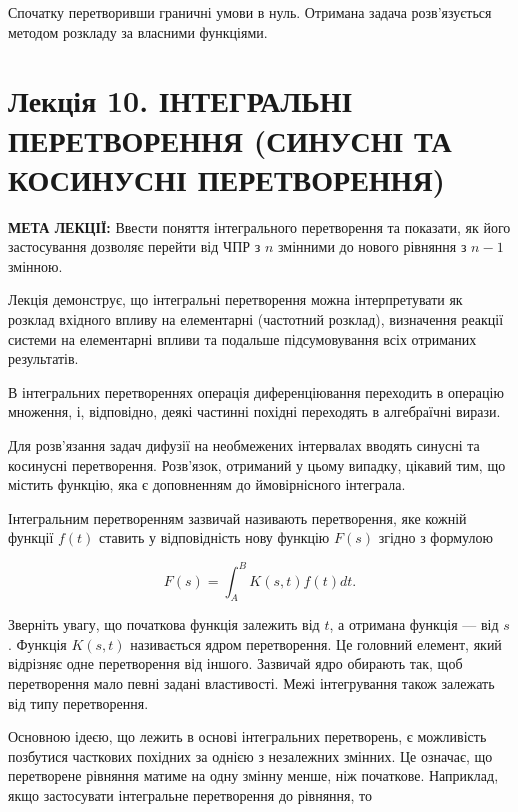\documentclass[
  ukrainian,
]{article}
\begin{document}
Спочатку перетворивши граничні умови в нуль. Отримана задача
розв'язується методом розкладу за власними функціями.

\section{Лекція 10. ІНТЕГРАЛЬНІ ПЕРЕТВОРЕННЯ (СИНУСНІ ТА КОСИНУСНІ
ПЕРЕТВОРЕННЯ)}\label{ux43bux435ux43aux446ux456ux44f-10.-ux456ux43dux442ux435ux433ux440ux430ux43bux44cux43dux456-ux43fux435ux440ux435ux442ux432ux43eux440ux435ux43dux43dux44f-ux441ux438ux43dux443ux441ux43dux456-ux442ux430-ux43aux43eux441ux438ux43dux443ux441ux43dux456-ux43fux435ux440ux435ux442ux432ux43eux440ux435ux43dux43dux44f}

\textbf{МЕТА ЛЕКЦІЇ:} Ввести поняття інтегрального перетворення та
показати, як його застосування дозволяє перейти від ЧПР з \(n\) змінними
до нового рівняння з \(n - 1\) змінною.

Лекція демонструє, що інтегральні перетворення можна інтерпретувати як
розклад вхідного впливу на елементарні (частотний розклад), визначення
реакції системи на елементарні впливи та подальше підсумовування всіх
отриманих результатів.

В інтегральних перетвореннях операція диференціювання переходить в
операцію множення, і, відповідно, деякі частинні похідні переходять в
алгебраїчні вирази.

Для розв'язання задач дифузії на необмежених інтервалах вводять синусні
та косинусні перетворення. Розв'язок, отриманий у цьому випадку, цікавий
тим, що містить функцію, яка є доповненням до ймовірнісного інтеграла.

Інтегральним перетворенням зазвичай називають перетворення, яке кожній
функції \(f(t)\) ставить у відповідність нову функцію \(F(s)\) згідно з
формулою

\[
F(s) = \int_{A}^{B} K(s, t) f(t) dt.
\]

Зверніть увагу, що початкова функція залежить від \(t\), а отримана
функція --- від \(s\). Функція \(K(s,t)\) називається ядром
перетворення. Це головний елемент, який відрізняє одне перетворення від
іншого. Зазвичай ядро обирають так, щоб перетворення мало певні задані
властивості. Межі інтегрування також залежать від типу перетворення.

Основною ідеєю, що лежить в основі інтегральних перетворень, є
можливість позбутися часткових похідних за однією з незалежних змінних.
Це означає, що перетворене рівняння матиме на одну змінну менше, ніж
початкове. Наприклад, якщо застосувати інтегральне перетворення до
рівняння, то
\end{document}
